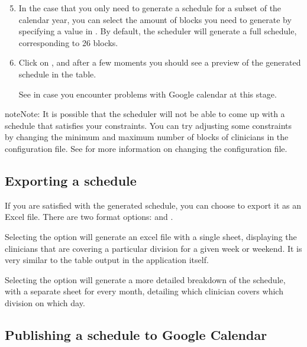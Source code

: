 \documentclass[letterpaper,10pt,english]{sphinxmanual}
\begin{document}
\begin{enumerate}
\setcounter{enumi}{4}
\item {} 
 In the case that you only need to generate a schedule for
a subset of the calendar year, you can select the amount of blocks you need
to generate by specifying a value in . By default, the
scheduler will generate a full schedule, corresponding to 26 blocks.

\end{enumerate}
\begin{enumerate}
\setcounter{enumi}{5}
\item {} 
Click on , and after a few moments you should see a preview of
the generated schedule in the table.

 See {\hyperref[\detokenize{index:authentication}]{}} in case you encounter problems
with Google calendar at this stage.

\end{enumerate}

\begin{sphinxadmonition}{note}{Note:}
It is possible that the scheduler will not be able to come up with a
schedule that satisfies your constraints. You can try adjusting
some constraints by changing the minimum and maximum number of blocks of
clinicians in the configuration file. See {\hyperref[\detokenize{index:clinician-configuration}]{}}
for more information on changing the configuration file.
\end{sphinxadmonition}


\subsection{Exporting a schedule}
\label{\detokenize{index:exporting-a-schedule}}
If you are satisfied with the generated schedule, you can choose to export
it as an Excel file. There are two format options:  and
.

Selecting the  option will generate an excel file with a single
sheet, displaying the clinicians that are covering a particular division
for a given week or weekend. It is very similar to the table output in
the application itself.

Selecting the  option will generate a more detailed breakdown
of the schedule, with a separate sheet for every month, detailing which
clinician covers which division on which day.


\subsection{Publishing a schedule to Google Calendar}
\label{\detokenize{index:publishing-a-schedule-to-google-calendar}}\label{\detokenize{index:id5}}


\renewcommand{\indexname}{Index}
\printindex
\end{document}
